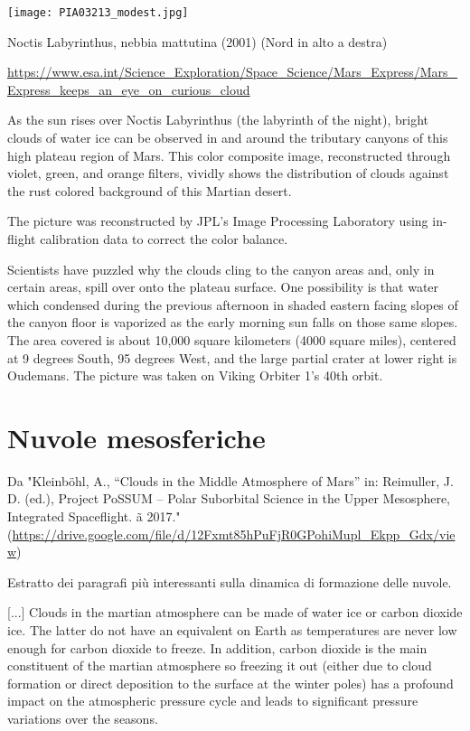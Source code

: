 \documentclass[a4paper,10pt,openany,oneside]{memoir}
\begin{document}
\texttt{[image: PIA03213\_modest.jpg]}

Noctis Labyrinthus, nebbia mattutina (2001) (Nord in alto a destra)

\url{https://www.esa.int/Science_Exploration/Space_Science/Mars_Express/Mars_Express_keeps_an_eye_on_curious_cloud}


As the sun rises over Noctis Labyrinthus (the labyrinth of the night), bright clouds of water ice can be observed in and around the tributary canyons of this high plateau region of Mars. This color composite image, reconstructed through violet, green, and orange filters, vividly shows the distribution of clouds against the rust colored background of this Martian desert.

The picture was reconstructed by JPL's Image Processing Laboratory using in-flight calibration data to correct the color balance.

Scientists have puzzled why the clouds cling to the canyon areas and, only in certain areas, spill over onto the plateau surface. One possibility is that water which condensed during the previous afternoon in shaded eastern facing slopes of the canyon floor is vaporized as the early morning sun falls on those same slopes. The area covered is about 10,000 square kilometers (4000 square miles), centered at 9 degrees South, 95 degrees West, and the large partial crater at lower right is Oudemans. The picture was taken on Viking Orbiter 1's 40th orbit. 





\section{Nuvole mesosferiche}

Da "Kleinböhl, A., “Clouds in the Middle Atmosphere of Mars” in: Reimuller, J. D. (ed.), Project PoSSUM –
Polar Suborbital Science in the Upper Mesosphere, Integrated Spaceflight. ã 2017." (\url{https://drive.google.com/file/d/12Fxmt85hPuFjR0GPohiMupl_Ekpp_Gdx/view}) 

Estratto dei paragrafi più interessanti sulla dinamica di formazione delle nuvole.

[...] Clouds in the martian atmosphere can be made of water ice or carbon dioxide ice. The latter do not have an equivalent on Earth as temperatures are never low enough for carbon dioxide to freeze. In addition, carbon dioxide is the main constituent of the martian atmosphere so freezing it out (either due to cloud formation or direct deposition to the surface at the winter poles) has a profound impact on the atmospheric pressure cycle and leads to significant pressure variations over the seasons.
\end{document}
